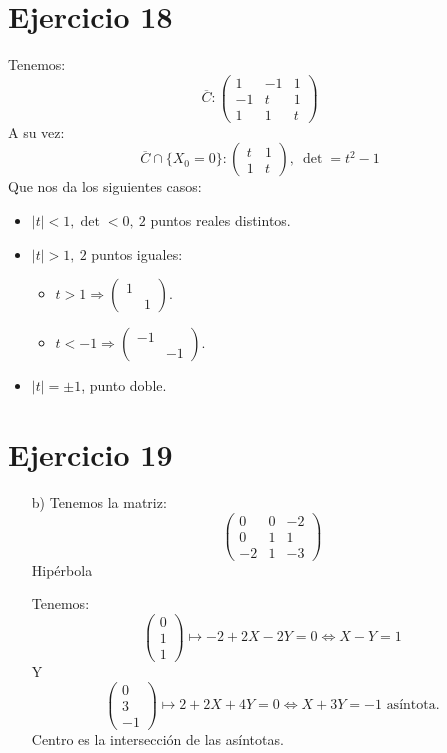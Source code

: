 \documentclass[10pt,a4paper,openright]{book}
\theoremstyle{break}
\begin{document}
\section{Ejercicio 18}%
\label{sec:ejercicio_18_4}
Tenemos: 
\[
    \overline{C} : \begin{pmatrix} 1 & -1 & 1\\ -1 & t & 1\\ 1 & 1 & t \end{pmatrix} 
\]
A su vez:
\[
    \overline{C} \cap \{X_0 = 0\} : \begin{pmatrix} t & 1\\ 1 & t \end{pmatrix},\ \det = t^2 - 1
\]
Que nos da los siguientes casos:
\begin{itemize}
    \item $\lvert t \rvert < 1, \det < 0,\ 2 $ puntos reales distintos.
    \item $\left| t \right| > 1,\ 2$ puntos iguales: 
    \begin{itemize}
        \item $t > 1 \Rightarrow \begin{pmatrix} 1 & \\ & 1 \end{pmatrix}$.
        \item $t < -1 \Rightarrow \begin{pmatrix} -1 & \\ & -1 \end{pmatrix}$.
    \end{itemize}
    \item $\left| t \right| = \pm 1$, punto doble.
\end{itemize}

\section{Ejercicio 19}%
\label{sec:ejercicio_19_4}
\begin{itemize}
\item[b)] Tenemos la matriz:
\[
    \begin{pmatrix} 0 & 0 & -2\\ 0 & 1 & 1\\ -2 & \boxed{1}  & \boxed{-3}  \end{pmatrix} 
\]
Hipérbola

Tenemos:
\[
    \begin{pmatrix} 0\\ 1\\ 1 \end{pmatrix} \mapsto -2 + 2X - 2Y = 0 \Leftrightarrow X - Y = 1
\]
Y
\[
    \begin{pmatrix} 0\\ 3\\ -1 \end{pmatrix} \mapsto 2 + 2X + 4Y = 0 \Leftrightarrow X + 3Y = -1 \text{ asíntota.} 
\]
Centro es la intersección de las asíntotas.
\end{itemize}
\end{document}
